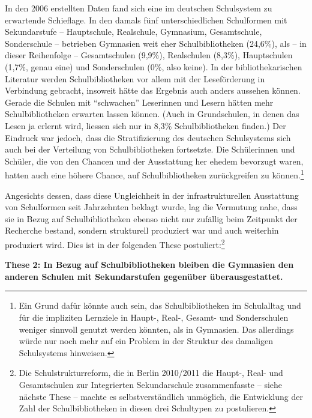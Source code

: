\documentclass[a4paper,
fontsize=11pt,
oneside,
numbers=noperiodatend,
parskip=half-,
bibliography=totoc,
final
]{scrartcl}
\begin{document}
In den 2006 erstellten Daten fand sich eine im deutschen Schulsystem zu
erwartende Schieflage. In den damals fünf unterschiedlichen Schulformen
mit Sekundarstufe -- Hauptschule, Realschule, Gymnasium, Gesamtschule,
Sonderschule -- betrieben Gymnasien weit eher Schulbibliotheken
(24,6\%), als -- in dieser Reihenfolge -- Gesamtschulen (9,9\%),
Realschulen (8,3\%), Hauptschulen (1,7\%, genau eine) und Sonderschulen
(0\%, also keine). In der bibliothekarischen Literatur werden
Schulbibliotheken vor allem mit der Leseförderung in Verbindung
gebracht, insoweit hätte das Ergebnis auch anders aussehen können.
Gerade die Schulen mit \enquote{schwachen} Leserinnen und Lesern hätten
mehr Schulbibliotheken erwarten lassen können. (Auch in Grundschulen, in
denen das Lesen ja erlernt wird, liessen sich nur in 8,3\%
Schulbibliotheken finden.) Der Eindruck war jedoch, dass die
Stratifizierung des deutschen Schulsystems sich auch bei der Verteilung
von Schulbibliotheken fortsetzte. Die Schülerinnen und Schüler, die von
den Chancen und der Ausstattung her ehedem bevorzugt waren, hatten auch
eine höhere Chance, auf Schulbibliotheken zurückgreifen zu
können.\footnote{Ein Grund dafür könnte auch sein, das Schulbibliotheken
  im Schulalltag und für die impliziten Lernziele in Haupt-, Real-,
  Gesamt- und Sonderschulen weniger sinnvoll genutzt werden könnten, als
  in Gymnasien. Das allerdings würde nur noch mehr auf ein Problem in
  der Struktur des damaligen Schulsystems hinweisen.}

Angesichts dessen, dass diese Ungleichheit in der infrastrukturellen
Ausstattung von Schulformen seit Jahrzehnten beklagt wurde, lag die
Vermutung nahe, dass sie in Bezug auf Schulbibliotheken ebenso nicht nur
zufällig beim Zeitpunkt der Recherche bestand, sondern strukturell
produziert war und auch weiterhin produziert wird. Dies ist in der
folgenden These postuliert:\footnote{Die Schulstrukturreform, die in
  Berlin 2010/2011 die Haupt-, Real- und Gesamtschulen zur Integrierten
  Sekundarschule zusammenfasste -- siehe nächste These -- machte es
  selbstverständlich unmöglich, die Entwicklung der Zahl der
  Schulbibliotheken in diesen drei Schultypen zu postulieren.}

\textbf{These 2: In Bezug auf Schulbibliotheken bleiben die Gymnasien den
anderen Schulen mit Sekundarstufen gegenüber überausgestattet.}
\end{document}
